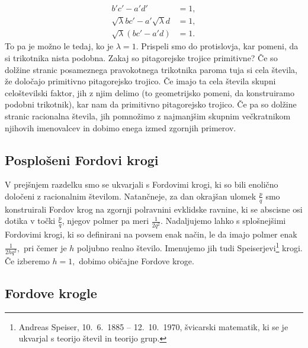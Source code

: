 \documentclass[mat1]{fmfdelo}
\begin{document}
\begin{dokaz}
%
\begin{align}
b'c'-a'd' &= 1, \nonumber \\
\sqrt\lambda bc' - a' \sqrt\lambda d &= 1, \nonumber \\
\sqrt\lambda (bc'-a'd) &= 1.
\end{align}
%
To pa je možno le tedaj, ko je $\lambda=1.$ Prispeli smo do protislovja, kar pomeni, da si trikotnika nista podobna.
%
Zakaj so pitagorejske trojice primitivne?
Če so dolžine stranic posameznega pravokotnega trikotnika paroma tuja si cela števila, že določajo primitivno pitagorejsko trojico.
Če imajo ta cela števila skupni celoštevilski faktor, jih z njim delimo (to geometrijsko pomeni, da konstruiramo podobni trikotnik), kar nam da primitivno pitagorejsko trojico.
Če pa so dolžine stranic racionalna števila, jih pomnožimo z najmanjšim skupnim večkratnikom njihovih imenovalcev in dobimo enega izmed zgornjih primerov.
\end{dokaz}

\subsection{Posplošeni Fordovi krogi}

V prejšnjem razdelku smo se ukvarjali s Fordovimi krogi, ki so bili enolično določeni z racionalnim številom. Natančneje, za dan okrajšan ulomek $\frac{p}{q}$ smo konstruirali Fordov krog na zgornji polravnini evklidske ravnine, ki se abscisne osi dotika v točki $\frac{p}{q}$, njegov polmer pa meri $\frac{1}{2q^2}.$
Nadaljujemo lahko s splošnejšimi Fordovimi krogi, ki so definirani na povsem enak način, le da imajo polmer enak $\frac{1}{2hq^2},$ pri čemer je $h$ poljubno realno število. Imenujemo jih tudi Speiserjevi\footnote{Andreas Speiser, 10.\ 6.\ 1885 -- 12.\ 10.\ 1970, švicarski matematik, ki se je ukvarjal s teorijo števil in teorijo grup.} krogi. Če izberemo $h=1,$ dobimo običajne Fordove kroge.

\subsection{Fordove krogle}
\end{document}
